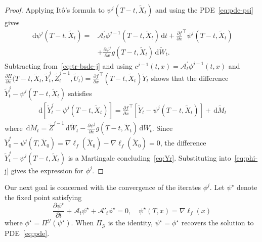 \documentclass[letterpaper, 10 pt, conference]{ieeeconf}  %
\newcommand{\ud}{\,\mathrm{d}}
\newcommand{\Xr}{\tilde X}
\newcommand{\Ur}{\tilde U}
\newcommand{\Yr}{\tilde Y}
\newcommand{\Zr}{\tilde Z}
\begin{document}
\begin{proof}
Applying It\^{o}'s formula to $\psi^j(T-t,\tilde{X}_t)$ and using 
the PDE~\eqref{eq:pde-psi} gives
\begin{align*}
    \ud \psi^j(T-t,\tilde X_t) 
    = &\mathcal A^\prime_t \phi^{j-1}(T-t,\tilde X_t) \ud t + \frac{\partial f}{\partial x}^\top \psi^j(T-t,\tilde X_t) \\&+\frac{\partial \psi^j}{\partial x}g(T-t,\tilde X_t) \ud \tilde W_t.
\end{align*}
Subtracting from~\eqref{eq:tr-bsde-j} and using $c^{j-1}(t,x)=\mathcal A^\prime_t \phi^{j-1}(t,x)$ and $\frac{\partial H}{\partial x}\big(T-t,\Xr_t,\Yr^j_t,\Zr^{j-1}_t,\Ur_t\big)=\frac{\partial f}{\partial x}^\top(T-t,\tilde X_t)\tilde Y_t$ shows that the difference $\tilde{Y}^j_t - \psi^j(T-t,\tilde{X}_t)$ satisfies
\begin{align*}
    \ud \left[\Yr^j_t - \psi^j(T-t,\tilde X_t)\right] = \frac{\partial f}{\partial x}^\top\left[\Yr_t - \psi^j(T-t,\tilde X_t)\right] + \ud \tilde M_t
\end{align*}
where $\ud \tilde M_t = \Zr^{j-1} \ud \tilde W_t-\frac{\partial \psi^j}{\partial x}g(T-t,\tilde X_t) \ud \tilde W_t$. Since $\tilde Y^j_0 - \psi^j(T,\tilde X_0) = \nabla \ell_f(\tilde X_0)-\nabla \ell_f(\tilde X_0)=0$, the difference $\Yr^j_t - \psi^j(T-t,\tilde X_t)$ is a Martingale concluding~\eqref{eq:Yr}. Substituting 
into~\eqref{eq:phi-j} gives the expression for $\phi^j$.
\end{proof}


Our next goal is concerned with the convergence of the iterates $\phi^j$. Let $\psi^\star$ denote the fixed point satisfying
\begin{equation*}
    \frac{\partial \psi^\star}{\partial t} + \mathcal A_t \psi^\star + \mathcal A'_t \phi^\star  =0,\quad \psi^\star(T,x) = \nabla \ell_f(x)
\end{equation*}
where $\phi^\star = \Pi^{\mathcal G}(\psi^\star)$. 
When $\Pi_{\mathcal{G}}$ is the identity, $\psi^\star = \phi^\star$ recovers 
the solution to PDE~\eqref{eq:pde}. 
\end{document}
